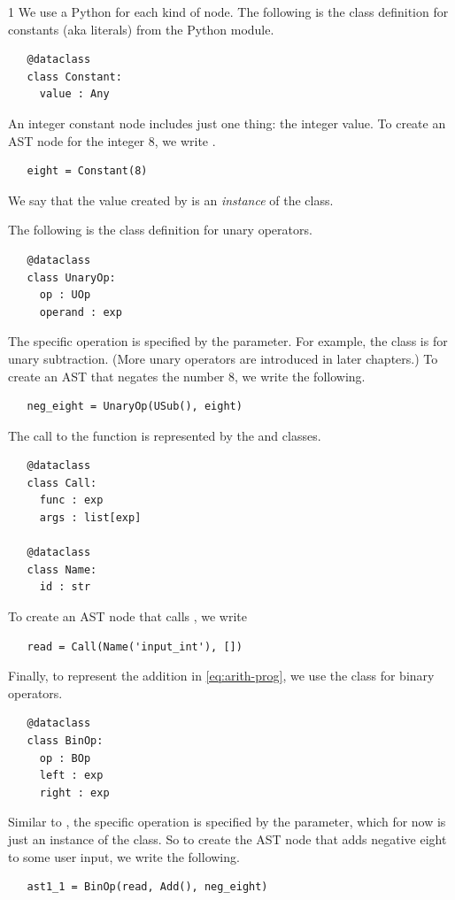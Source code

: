 \documentclass[7x10]{TimesAPriori_MIT}%
\def\pythonEd{1}
\def\edition{1}
\newcommand{\pythonColor}[0]{}
\numberwithin{theorem}{chapter}
\numberwithin{definition}{chapter}
\numberwithin{equation}{chapter}
\begin{document}
{\if\edition\pythonEd\pythonColor
We use a Python  for each kind of node.
The following is the class definition for
constants (aka literals)
from the Python  module.
\begin{lstlisting}
   @dataclass
   class Constant:
     value : Any
\end{lstlisting}
An integer constant node includes just one thing: the integer value.
To create an AST node for the integer $8$, we write .
\begin{lstlisting}
   eight = Constant(8)
\end{lstlisting}
We say that the value created by  is an
\emph{instance} of the  class.

The following is the class definition for unary operators.
\begin{lstlisting}
   @dataclass
   class UnaryOp:
     op : UOp
     operand : exp
\end{lstlisting}
The specific operation is specified by the  parameter.  For
example, the class  is for unary subtraction.
(More unary operators are introduced in later chapters.) To create an AST that
negates the number $8$, we write the following.
\begin{lstlisting}
   neg_eight = UnaryOp(USub(), eight)
\end{lstlisting}

The call to the  function is represented by the
 and  classes.
\begin{lstlisting}
   @dataclass
   class Call:
     func : exp
     args : list[exp]

   @dataclass
   class Name:
     id : str
\end{lstlisting}
To create an AST node that calls , we write
\begin{lstlisting}
   read = Call(Name('input_int'), [])
\end{lstlisting}

Finally, to represent the addition in \eqref{eq:arith-prog}, we use
the  class for binary operators.
\begin{lstlisting}
   @dataclass
   class BinOp:
     op : BOp
     left : exp
     right : exp
\end{lstlisting}
Similar to , the specific operation is specified by the
 parameter, which for now is just an instance of the
 class. So to create the AST
node that adds negative eight to some user input, we write the following.
\begin{lstlisting}
   ast1_1 = BinOp(read, Add(), neg_eight)
\end{lstlisting}
\fi}
\end{document}
